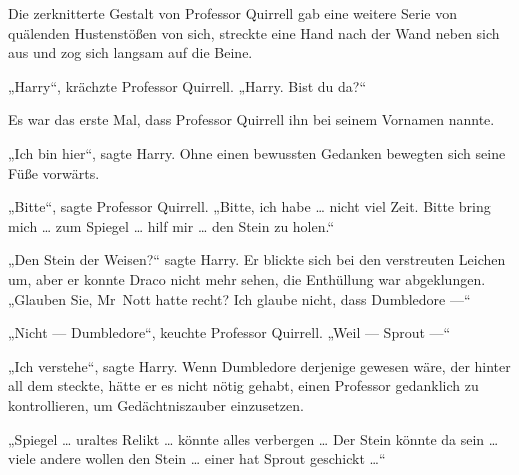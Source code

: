Die zerknitterte Gestalt von Professor Quirrell gab eine weitere Serie von quälenden Hustenstößen von sich, streckte eine Hand nach der Wand neben sich aus und zog sich langsam auf die Beine.

„Harry“, krächzte Professor Quirrell.
„Harry. Bist du da?“

Es war das erste Mal, dass Professor Quirrell ihn bei seinem Vornamen nannte.

„Ich bin hier“, sagte Harry. Ohne einen bewussten Gedanken bewegten sich seine Füße vorwärts.

„Bitte“, sagte Professor Quirrell.
„Bitte, ich habe … nicht viel Zeit. Bitte bring mich … zum Spiegel … hilf mir … den Stein zu holen.“

„Den Stein der Weisen?“ sagte Harry.
Er blickte sich bei den verstreuten Leichen um, aber er konnte Draco nicht mehr sehen, die Enthüllung war abgeklungen.
„Glauben Sie, Mr~Nott hatte recht? Ich glaube nicht, dass Dumbledore —“

„Nicht — Dumbledore“, keuchte Professor Quirrell.
„Weil — Sprout —“

„Ich verstehe“, sagte Harry.
Wenn Dumbledore derjenige gewesen wäre, der hinter all dem steckte, hätte er es nicht nötig gehabt, einen Professor gedanklich zu kontrollieren, um Gedächtniszauber einzusetzen.

„Spiegel … uraltes Relikt … könnte alles verbergen … Der Stein könnte da sein … viele andere wollen den Stein … einer hat Sprout geschickt …“

